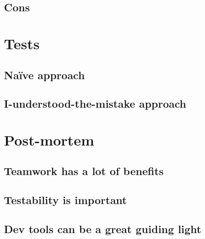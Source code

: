 \documentclass[11pt]{article}
\begin{document}

\subsection{Cons}

\section{Tests}
\subsection{Naïve approach}



\subsection{I-understood-the-mistake approach}

\section{Post-mortem}
\subsection{Teamwork has a lot of benefits}
\subsection{Testability is important}
\subsection{Dev tools can be a great guiding light}
\end{document}
